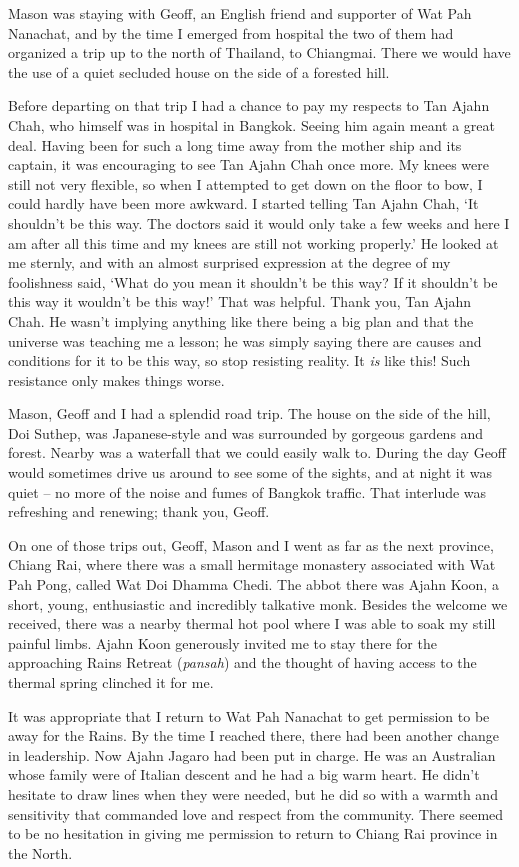 Mason was staying with Geoff, an English friend and supporter of Wat Pah
Nanachat, and by the time I emerged from hospital the two of them had
organized a trip up to the north of Thailand, to Chiangmai. There we
would have the use of a quiet secluded house on the side of a forested
hill.

Before departing on that trip I had a chance to pay my respects to Tan
Ajahn Chah, who himself was in hospital in Bangkok. Seeing him again
meant a great deal. Having been for such a long time away from the
mother ship and its captain, it was encouraging to see Tan Ajahn Chah
once more. My knees were still not very flexible, so when I attempted to
get down on the floor to bow, I could hardly have been more awkward. I
started telling Tan Ajahn Chah, `It shouldn't be this way. The doctors
said it would only take a few weeks and here I am after all this time
and my knees are still not working properly.' He looked at me sternly,
and with an almost surprised expression at the degree of my foolishness
said, `What do you mean it shouldn't be this way? If it shouldn't be
this way it wouldn't be this way!' That was helpful. Thank you, Tan
Ajahn Chah. He wasn't implying anything like there being a big plan and
that the universe was teaching me a lesson; he was simply saying there
are causes and conditions for it to be this way, so stop resisting
reality. It \emph{is} like this! Such resistance only makes things
worse.

Mason, Geoff and I had a splendid road trip. The house on the side of
the hill, Doi Suthep, was Japanese-style and was surrounded by gorgeous
gardens and forest. Nearby was a waterfall that we could easily walk to.
During the day Geoff would sometimes drive us around to see some of the
sights, and at night it was quiet -- no more of the noise and fumes of
Bangkok traffic. That interlude was refreshing and renewing; thank you,
Geoff.

On one of those trips out, Geoff, Mason and I went as far as the next
province, Chiang Rai, where there was a small hermitage monastery
associated with Wat Pah Pong, called Wat Doi Dhamma Chedi. The abbot
there was Ajahn Koon, a short, young, enthusiastic and incredibly
talkative monk. Besides the welcome we received, there was a nearby
thermal hot pool where I was able to soak my still painful limbs. Ajahn
Koon generously invited me to stay there for the approaching Rains
Retreat (\emph{pansah}) and the thought of having access to the thermal
spring clinched it for me.

It was appropriate that I return to Wat Pah Nanachat to get permission
to be away for the Rains. By the time I reached there, there had been
another change in leadership. Now Ajahn Jagaro had been put in charge.
He was an Australian whose family were of Italian descent and he had a
big warm heart. He didn't hesitate to draw lines when they were needed,
but he did so with a warmth and sensitivity that commanded love and
respect from the community. There seemed to be no hesitation in giving
me permission to return to Chiang Rai province in the North.

